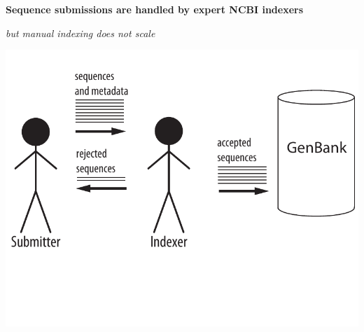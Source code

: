 \documentclass[landscape]{slides}
\begin{document}
\begin{slide}
\begin{center}
\textbf{Sequence submissions are handled by expert NCBI indexers}

\emph{but manual indexing does not scale}

\includegraphics[width=7in]{figs/submission-schematic-1}


\vfill
\end{center}
\end{slide}
\end{document}
